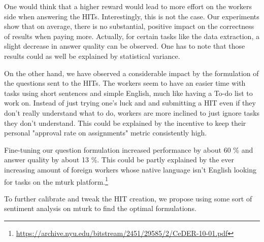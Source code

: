 \documentclass{article}
\begin{document}
One would think that a higher reward would lead to more effort on the workers side when answering the HITs. Interestingly, this is not the case. Our experiments show that on average, there is no substantial, positive impact on the correctness of results when paying more. Actually, for certain tasks like the data extraction, a slight decrease in answer quality can be observed. One has to note that those results could as well be explained by statistical variance.

On the other hand, we have observed a considerable impact by the formulation of the questions sent to the HITs. The workers seem to have an easier time with tasks using short sentences and simple English, much like having a To-do list to work on. Instead of just trying one's luck and and submitting a HIT even if they don't really understand what to do, workers are more inclined to just ignore tasks they don't understand. This could be explained by the incentive to keep their personal "approval rate on assignments" metric consistently high. 

Fine-tuning our question formulation increased performance by about 60 \% and answer quality by about 13 \%. This could be partly explained by the ever increasing amount of foreign workers whose native language isn't English looking for tasks on the mturk platform.\footnote{\url{https://archive.nyu.edu/bitstream/2451/29585/2/CeDER-10-01.pdf}}

To further calibrate and tweak the HIT creation, we propose using some sort of sentiment analysis on mturk to find the optimal formulations.
\end{document}
